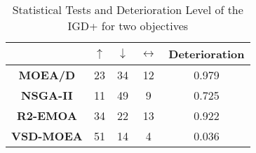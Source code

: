 \begin{table}[t]
\caption{Statistical Tests and Deterioration Level of the IGD+ for two objectives}
\label{tab:Tests_IGDP_2obj}
\centering
\begin{scriptsize}
\begin{tabular}{c c|c|c|c}
\cline{2-5}
                                        & \textbf{$\uparrow$} & \textbf{$\downarrow$} & \textbf{$\leftrightarrow$} & \textbf{Deterioration} \\ \hline
\multicolumn{1}{c|}{\textbf{MOEA/D}}   & 23                  & 34                    & 12                         & 0.979         \\ \hline
\multicolumn{1}{c|}{\textbf{NSGA-II}}  & 11                  & 49                    & 9                          & 0.725         \\ \hline
\multicolumn{1}{c|}{\textbf{R2-EMOA}}  & 34                  & 22                    & 13                         & 0.922         \\ \hline
\multicolumn{1}{c|}{\textbf{VSD-MOEA}} & 51                  & 14                    & 4                          & 0.036         \\ \hline
\end{tabular}%
\end{scriptsize}
\end{table}

